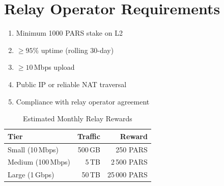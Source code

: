 \documentclass[11pt,a4paper]{article}
\begin{document}
\section{Relay Operator Requirements}
\label{app:relay}

\begin{enumerate}
    \item Minimum 1000 PARS stake on L2
    \item $\geq 95\%$ uptime (rolling 30-day)
    \item $\geq 10$\,Mbps upload
    \item Public IP or reliable NAT traversal
    \item Compliance with relay operator agreement
\end{enumerate}

\begin{table}[h]
\centering
\caption{Estimated Monthly Relay Rewards}
\begin{tabular}{@{}lrr@{}}
\toprule
\textbf{Tier}        & \textbf{Traffic} & \textbf{Reward} \\
\midrule
Small (10\,Mbps)     & 500\,GB  & 250 PARS \\
Medium (100\,Mbps)   & 5\,TB    & 2\,500 PARS \\
Large (1\,Gbps)      & 50\,TB   & 25\,000 PARS \\
\bottomrule
\end{tabular}
\end{table}
\end{document}

